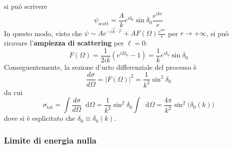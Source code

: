 \documentclass[11pt, a4paper]{scrartcl}
\theoremstyle{style}
\newcommand{\dd}{\mathop{}\!\mathrm{d}}
\numberwithin{equation}{subsection}
\begin{document}
si pu\`o scrivere
\begin{equation}
\psi _\text{scatt} = \frac{A}{k} e^{i \delta _0} \sin \delta _0 \frac{e^{ ikr}}{r}
\end{equation}
In questo modo, visto che $\psi \sim A e^{-i \vec{k}\cdot \vec{r}}+ A F(\Omega ) \frac{e^{ikr}}{r}$ per $r\to +\infty$, si pu\`o ricavare l'\textbf{ampiezza di scattering} per $\ell =0$:
\begin{equation}
	F(\Omega ) = \frac{1}{2ik} \left(e^{i 2 \delta _0}- 1\right) =\frac{1}{k} e^{i \delta _0}\sin \delta _0
\end{equation}
Conseguentemente, la sezione d'urto differenziale del processo \`e
\[
\frac{d \sigma }{d \Omega }  = \lvert F(\Omega ) \rvert ^2 = \frac{1}{k^2} \sin^2 \delta _0
\] 
da cui 
\begin{equation}
	\sigma _\text{tot} = \int \frac{d \sigma }{d \Omega } \dd \Omega  = \frac{1}{k^2} \sin^2 \delta _0 \int \dd \Omega  = \frac{4\pi}{k^2}\sin^2 \big(\delta _0(k)\big)
\end{equation}
dove si \`e esplicitato che $\delta _0 \equiv \delta _0(k)$.

\subsubsection{Limite di energia nulla}
\end{document}
